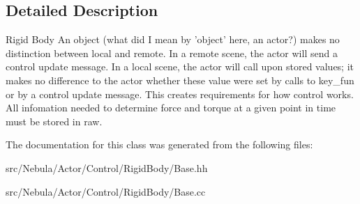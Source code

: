 \subsection{Detailed Description}
Rigid Body An object (what did I mean by 'object' here, an actor?) makes no distinction between local and remote. In a remote scene, the actor will send a control update message. In a local scene, the actor will call upon stored values; it makes no difference to the actor whether these value were set by calls to key\-\_\-fun or by a control update message. This creates requirements for how control works. All infomation needed to determine force and torque at a given point in time must be stored in raw. 

The documentation for this class was generated from the following files\-:\begin{DoxyCompactItemize}
\item 
src/\-Nebula/\-Actor/\-Control/\-Rigid\-Body/Base.\-hh\item 
src/\-Nebula/\-Actor/\-Control/\-Rigid\-Body/Base.\-cc\end{DoxyCompactItemize}
